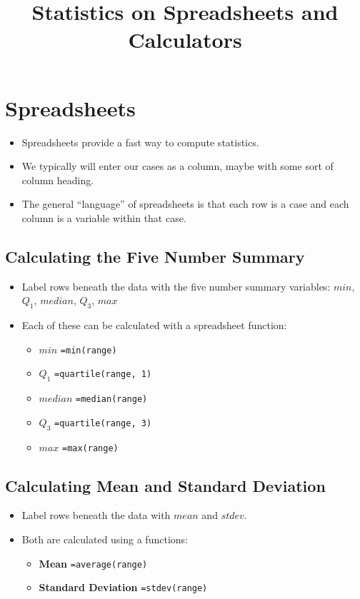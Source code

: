 \documentclass{article}
\title{Statistics on Spreadsheets and Calculators}
\date{}
\begin{document}
\maketitle

\section{Spreadsheets}
\begin{itemize}
\item Spreadsheets provide a fast way to compute statistics.
\item We typically will enter our cases as a column, maybe with some
    sort of column heading.
\item The general ``language'' of spreadsheets is that each row is
    a case and each column is a variable within that case.
\end{itemize}


\subsection{Calculating the Five Number Summary}
\begin{itemize}
\item Label rows beneath the data with the five number summary
    variables: $min$, $Q_1$, $median$, $Q_3$, $max$
\item Each of these can be calculated with a spreadsheet function:
    \begin{itemize}
    \item \textbf{$min$}  \verb!=min(range)!
    \item \textbf{$Q_1$}  \verb!=quartile(range, 1)!
    \item \textbf{$median$}  \verb!=median(range)!
    \item \textbf{$Q_3$}  \verb!=quartile(range, 3)!
    \item \textbf{$max$}  \verb!=max(range)!
    \end{itemize}
\end{itemize}

\subsection{Calculating Mean and Standard Deviation}
\begin{itemize}
\item Label rows beneath the data with $mean$ and $stdev$.
\item Both are calculated using a functions:
    \begin{itemize}
    \item \textbf{Mean}  \verb!=average(range)!
    \item \textbf{Standard Deviation}  \verb!=stdev(range)!
    \end{itemize}
\end{itemize}
\end{document}
